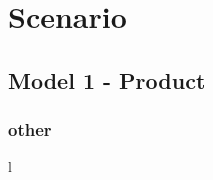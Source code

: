 \documentclass[]{report}
\title{}
\author{Leo HENRY}
\begin{document}
	
	\maketitle
	
	\begin{abstract}
		
	\end{abstract}


\part{Scenario}


\chapter{Model 1 - Product}

\section{other}
l
\end{document}
